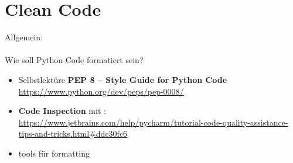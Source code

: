 \section{Clean Code} 
Allgemein:
~\\~\\
Wie soll Python-Code formatiert sein? 
	\begin{itemize}
		\item Selbstlektüre \textbf{PEP 8 -- Style Guide for Python Code}\\
		\url{https://www.python.org/dev/peps/pep-0008/}
		\item \textbf{Code Inspection} mit \pycharm:\\ \url{https://www.jetbrains.com/help/pycharm/tutorial-code-quality-assistance-tips-and-tricks.html\#ddc30fc6}
		\item tools für formatting
	\end{itemize}